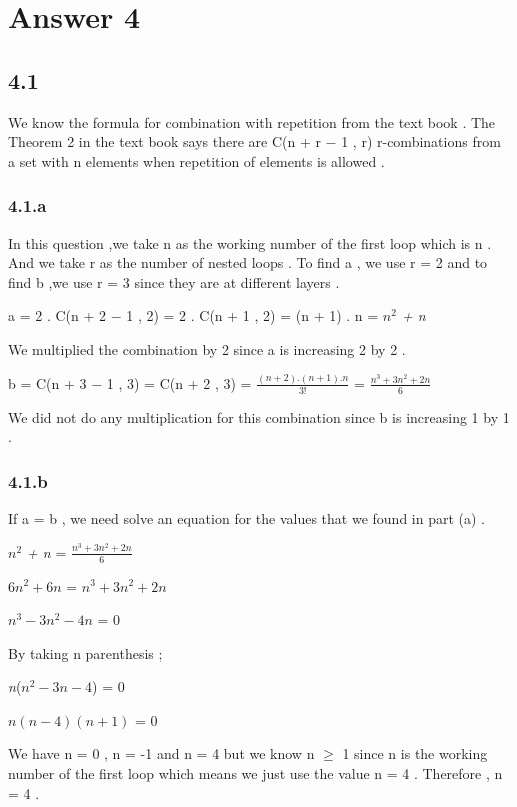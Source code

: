 \documentclass[12pt]{article}
\begin{document}
\section*{Answer 4}
\subsection*{4.1} 
\hspace{15px} We know the formula for combination with repetition from the text book . The Theorem 2 in the text book says there are C(n + r \textit{$-$} 1 , r) r-combinations from a set with n elements when repetition of elements is allowed .
\subsubsection*{4.1.a} 
\hspace{15px} In this question ,we take n as the working number of the first loop which is n . And we take r as the number of nested loops . To find a , we use r = 2 and to find b ,we use r = 3 since they are at different layers . \par 
a = 2 . C(n + 2 \textit{$-$} 1 , 2) = 2 . C(n + 1 , 2) = (n + 1) . n = \textit{$n^2$ + n} \par 
We multiplied the combination by 2 since a is increasing 2 by 2 . \par
b = C(n + 3 \textit{$-$} 1 , 3) = C(n + 2 , 3) = $\frac{(n+2).(n+1).n}{3!}$ = $\frac{\textit{$n^3+3n^2+2n$}}{6}$ \par 
We did not do any multiplication for this combination since b is increasing 1 by 1 . 
\subsubsection*{4.1.b}
\hspace{15px} If a = b , we need solve an equation for the values that we found in part (a) . \\ \par 
\textit{$n^2$ + n} = $\frac{\textit{$n^3+3n^2+2n$}}{6}$ \par 
\textit{$6n^2+6n$} = \textit{$n^3+3n^2+2n$} \par 
\textit{$n^3-3n^2-4n$} = 0 \par 
By taking n parenthesis ; \par 
\textit{n}(\textit{$n^2-3n-4$}) = 0 \par 
\textit{$n(n-4)(n+1)$} = 0 \par 
We have n = 0 , n = -1 and n = 4 but we know n $\geq$ 1 since n is the working number of the first loop which means we just use the value n = 4 . Therefore , n = 4 . 
\end{document}
